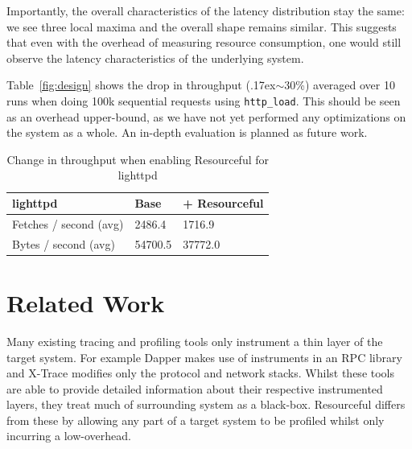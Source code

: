 \documentclass[letterpaper,twocolumn,10pt]{article}
\newcommand{\pname}{Resourceful}
\begin{document}
Importantly, the overall characteristics of the latency distribution stay the
same: we see three local maxima and the overall shape remains similar. This
suggests that even with the overhead of measuring resource consumption, one
would still observe the latency characteristics of the underlying system. 

Table~\ref{fig:design} shows the drop in throughput ({\raise.17ex\hbox{$\scriptstyle\sim$}}30\%) averaged over 10
runs when doing 100k sequential requests using \texttt{http\_load}. This should
be seen as an overhead upper-bound, as we have not yet performed any
optimizations on the system as a whole. An in-depth evaluation is planned as
future work.

\begin{table}[ht!]
	\centering 
    \begin{tabular}{|l|l|l|}
    \hline
    \textbf{lighttpd}         & Base & + \pname \\ \hline
    Fetches / second (avg) & 2486.4 & 1716.9 \\ \hline
    Bytes / second (avg) & 54700.5 & 37772.0 \\ \hline
    \end{tabular}
    \caption{Change in throughput when enabling \pname{ } for lighttpd}
    \label{tbl:throughput} 
\end{table}

\section{Related Work} 




Many existing tracing and profiling tools only instrument a thin layer of the
target system. For example Dapper \cite{dapper} makes use of instruments in an
RPC library and X-Trace \cite{xtrace} modifies only the protocol and network
stacks. Whilst these tools are able to provide detailed information about their
respective instrumented layers, they treat much of surrounding system as a
black-box. \pname{ } differs from these by allowing any part of a target system
to be profiled whilst only incurring a low-overhead.  
\end{document}
